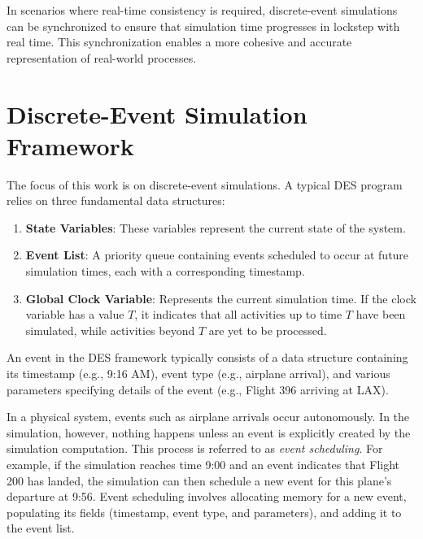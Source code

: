 In scenarios where real-time consistency is required, discrete-event simulations can be synchronized to ensure that simulation time progresses in lockstep with real time. This synchronization enables a more cohesive and accurate representation of real-world processes.

\section{Discrete-Event Simulation Framework}

The focus of this work is on discrete-event simulations. A typical DES program relies on three fundamental data structures:

\begin{enumerate}
    \item \textbf{State Variables}: These variables represent the current state of the system.
    \item \textbf{Event List}: A priority queue containing events scheduled to occur at future simulation times, each with a corresponding timestamp.
    \item \textbf{Global Clock Variable}: Represents the current simulation time. If the clock variable has a value $T$, it indicates that all activities up to time $T$ have been simulated, while activities beyond $T$ are yet to be processed.
\end{enumerate}

An event in the DES framework typically consists of a data structure containing its timestamp (e.g., 9:16 AM), event type (e.g., airplane arrival), and various parameters specifying details of the event (e.g., Flight 396 arriving at LAX).

In a physical system, events such as airplane arrivals occur autonomously. In the simulation, however, nothing happens unless an event is explicitly created by the simulation computation. This process is referred to as \textit{event scheduling}. For example, if the simulation reaches time 9:00 and an event indicates that Flight 200 has landed, the simulation can then schedule a new event for this plane’s departure at 9:56. Event scheduling involves allocating memory for a new event, populating its fields (timestamp, event type, and parameters), and adding it to the event list.

